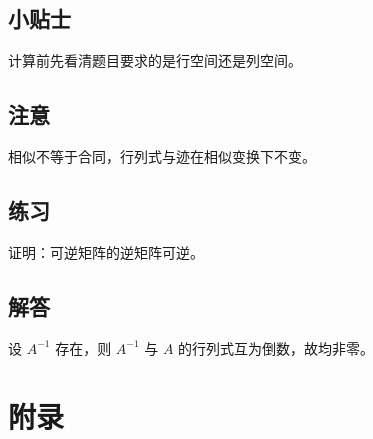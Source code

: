 \documentclass[11pt,a4paper]{harryopo-book}
\begin{document}
\section{小贴士}
\begin{tipbox}
计算前先看清题目要求的是行空间还是列空间。
\end{tipbox}

\section{注意}
\begin{warningbox}
相似不等于合同，行列式与迹在相似变换下不变。
\end{warningbox}

\section{练习}
\begin{practicebox}
证明：可逆矩阵的逆矩阵可逆。
\end{practicebox}

\section{解答}
\begin{answerbox}
设 $A^{-1}$ 存在，则 $A^{-1}$ 与 $A$ 的行列式互为倒数，故均非零。
\end{answerbox}

\backmatter
\chapter*{附录}
\end{document}
